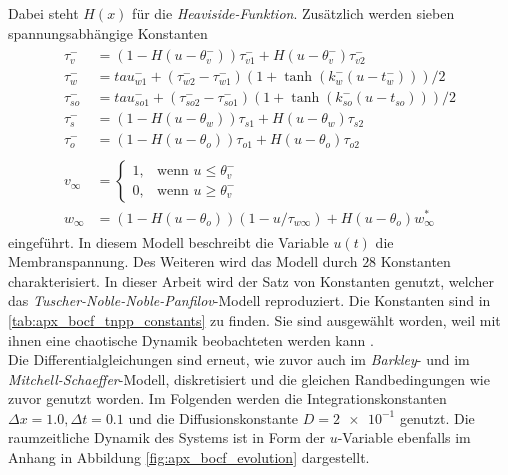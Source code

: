 Dabei steht $H(x)$ für die \textit{Heaviside-Funktion}. Zusätzlich werden sieben spannungsabhängige Konstanten
\begin{align}
\begin{aligned}
\tau_v^-   &= (1-H(u-\theta_v^-))\tau_{v1}^- + H(u-\theta_v^-)\tau_{v2}^- \\
\tau_w^-   &= tau_{w1}^- + (\tau_{w2}^- - \tau_{w1}^-)(1+\tanh(k_w^-(u-t_w^-)))/2 \\
\tau_{so}^- &= tau_{so1}^- + (\tau_{so2}^- - \tau_{so1}^-)(1+\tanh(k_{so}^-(u-t_{so})))/2 \\
\tau_s^-    &= (1-H(u-\theta_w))\tau_{s1} + H(u-\theta_w)\tau_{s2} \\ 
\tau_o^-    &= (1-H(u-\theta_o))\tau_{o1} + H(u-\theta_o)\tau_{o2} \\\\
v_\infty &= \begin{cases}
	1,& \text{wenn } u \leq \theta_v^-\\
    0,& \text{wenn } u \geq \theta_v^-
\end{cases} \\
w_\infty &= (1-H(u-\theta_o))(1-u/\tau_{w\infty}) + H(u-\theta_o)w_\infty^*
\end{aligned}
\end{align}
eingeführt. In diesem Modell beschreibt die Variable $u(t)$ die Membranspannung. Des Weiteren wird das Modell durch $28$ Konstanten charakterisiert. In dieser Arbeit wird der Satz von Konstanten genutzt, welcher das \textit{Tuscher-Noble-Noble-Panfilov}-Modell reproduziert. Die Konstanten sind in \ref{tab:apx_bocf_tnpp_constants} zu finden. Sie sind ausgewählt worden, weil mit ihnen eine chaotische Dynamik beobachteten werden kann \citep{Bueno-Orovio2008}.\\

Die Differentialgleichungen sind erneut, wie zuvor auch im \textit{Barkley}- und im \textit{Mitchell-Schaeffer}-Modell, diskretisiert und die gleichen Randbedingungen wie zuvor genutzt worden. Im Folgenden werden die Integrationskonstanten $\Delta x = 1.0, \Delta t = 0.1$ und die Diffusionskonstante $D = \num{2e-1}$ genutzt. Die raumzeitliche Dynamik des Systems ist in Form der $u$-Variable ebenfalls im Anhang in Abbildung \ref{fig:apx_bocf_evolution} dargestellt.\\

